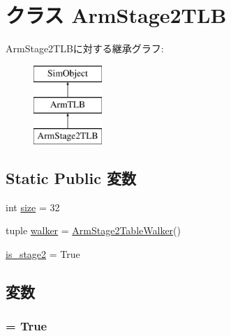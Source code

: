 \hypertarget{classArmTLB_1_1ArmStage2TLB}{
\section{クラス ArmStage2TLB}
\label{classArmTLB_1_1ArmStage2TLB}
}
ArmStage2TLBに対する継承グラフ:\begin{figure}[H]
\begin{center}
\leavevmode
\includegraphics[height=3cm]{classArmTLB_1_1ArmStage2TLB}
\end{center}
\end{figure}
\subsection*{Static Public 変数}
\begin{DoxyCompactItemize}
\item 
int \hyperlink{classArmTLB_1_1ArmStage2TLB_a439227feff9d7f55384e8780cfc2eb82}{size} = 32
\item 
tuple \hyperlink{classArmTLB_1_1ArmStage2TLB_a38c6e2cd4db9b456da7637543e59ccbe}{walker} = \hyperlink{classArmTLB_1_1ArmStage2TableWalker}{ArmStage2TableWalker}()
\item 
\hyperlink{classArmTLB_1_1ArmStage2TLB_ae8e57fdf256a1e5df80b0c5ab8a52336}{is\_\-stage2} = True
\end{DoxyCompactItemize}


\subsection{変数}
\hypertarget{classArmTLB_1_1ArmStage2TLB_ae8e57fdf256a1e5df80b0c5ab8a52336}{
\subsubsection[{is\_\-stage2}]{ = True}}
\label{classArmTLB_1_1ArmStage2TLB_ae8e57fdf256a1e5df80b0c5ab8a52336}


